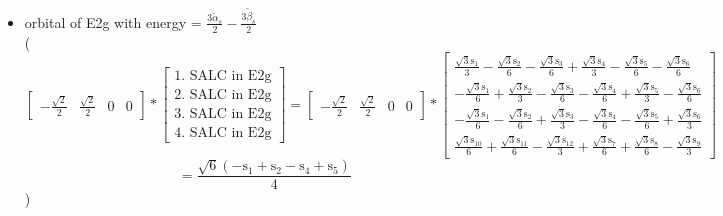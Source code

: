 \documentclass[12pt,a4paper]{article}
\begin{document}
\begin{itemize}
\textcolor{red}{Error in Orthogonalization of SALCs}\item orbital of E2g with energy = 
                                $\frac{3 \tilde{\alpha}_{s}}{2} - \frac{3 \tilde{\beta}_{s}}{2}$ \\
( 
$$
\left[\begin{matrix}- \frac{\sqrt{2}}{2} & \frac{\sqrt{2}}{2} & 0 & 0\end{matrix}\right] * \left[\begin{array}{c}\text{1. SALC in E2g} \\ \text{2. SALC in E2g} \\ \text{3. SALC in E2g} \\ \text{4. SALC in E2g}\end{array}\right] = \left[\begin{matrix}- \frac{\sqrt{2}}{2} & \frac{\sqrt{2}}{2} & 0 & 0\end{matrix}\right] * \left[\begin{matrix}\frac{\sqrt{3} \text{s}_{1}}{3} - \frac{\sqrt{3} \text{s}_{2}}{6} - \frac{\sqrt{3} \text{s}_{3}}{6} + \frac{\sqrt{3} \text{s}_{4}}{3} - \frac{\sqrt{3} \text{s}_{5}}{6} - \frac{\sqrt{3} \text{s}_{6}}{6}\\- \frac{\sqrt{3} \text{s}_{1}}{6} + \frac{\sqrt{3} \text{s}_{2}}{3} - \frac{\sqrt{3} \text{s}_{3}}{6} - \frac{\sqrt{3} \text{s}_{4}}{6} + \frac{\sqrt{3} \text{s}_{5}}{3} - \frac{\sqrt{3} \text{s}_{6}}{6}\\- \frac{\sqrt{3} \text{s}_{1}}{6} - \frac{\sqrt{3} \text{s}_{2}}{6} + \frac{\sqrt{3} \text{s}_{3}}{3} - \frac{\sqrt{3} \text{s}_{4}}{6} - \frac{\sqrt{3} \text{s}_{5}}{6} + \frac{\sqrt{3} \text{s}_{6}}{3}\\\frac{\sqrt{3} \text{s}_{10}}{6} + \frac{\sqrt{3} \text{s}_{11}}{6} - \frac{\sqrt{3} \text{s}_{12}}{3} + \frac{\sqrt{3} \text{s}_{7}}{6} + \frac{\sqrt{3} \text{s}_{8}}{6} - \frac{\sqrt{3} \text{s}_{9}}{3}\end{matrix}\right] 
 $$ $$ = \frac{\sqrt{6} \left(- \text{s}_{1} + \text{s}_{2} - \text{s}_{4} + \text{s}_{5}\right)}{4} 
 $$ 
 )


\end{itemize}
\end{document}
